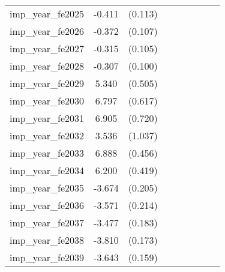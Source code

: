 {\begin{tabular}{l*{4}{cc}}
imp\_year\_fe2025&   -0.411\sym{***}&  (0.113)&                  &         &                  &         &                  &         \\
imp\_year\_fe2026&   -0.372\sym{***}&  (0.107)&                  &         &                  &         &                  &         \\
imp\_year\_fe2027&   -0.315\sym{**} &  (0.105)&                  &         &                  &         &                  &         \\
imp\_year\_fe2028&   -0.307\sym{**} &  (0.100)&                  &         &                  &         &                  &         \\
imp\_year\_fe2029&    5.340\sym{***}&  (0.505)&                  &         &                  &         &                  &         \\
imp\_year\_fe2030&    6.797\sym{***}&  (0.617)&                  &         &                  &         &                  &         \\
imp\_year\_fe2031&    6.905\sym{***}&  (0.720)&                  &         &                  &         &                  &         \\
imp\_year\_fe2032&    3.536\sym{***}&  (1.037)&                  &         &                  &         &                  &         \\
imp\_year\_fe2033&    6.888\sym{***}&  (0.456)&                  &         &                  &         &                  &         \\
imp\_year\_fe2034&    6.200\sym{***}&  (0.419)&                  &         &                  &         &                  &         \\
imp\_year\_fe2035&   -3.674\sym{***}&  (0.205)&                  &         &                  &         &                  &         \\
imp\_year\_fe2036&   -3.571\sym{***}&  (0.214)&                  &         &                  &         &                  &         \\
imp\_year\_fe2037&   -3.477\sym{***}&  (0.183)&                  &         &                  &         &                  &         \\
imp\_year\_fe2038&   -3.810\sym{***}&  (0.173)&                  &         &                  &         &                  &         \\
imp\_year\_fe2039&   -3.643\sym{***}&  (0.159)&                  &         &                  &         &                  &         \\

\end{tabular}}
